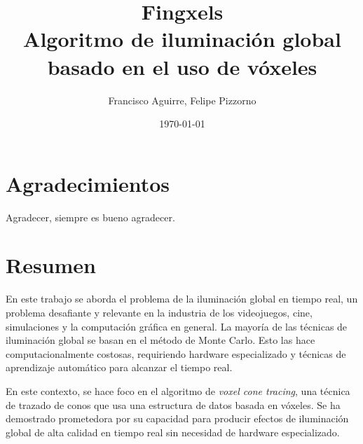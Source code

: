 \documentclass{prgrado}
\title{
	Fingxels \\
	\large Algoritmo de iluminación global basado en el uso de vóxeles
}
\author{Francisco Aguirre, Felipe Pizzorno}
\date{\today} %
\begin{document}

\frontmatter %

\maketitle


\chapter*{Agradecimientos}

Agradecer, siempre es bueno agradecer. %


\chapter*{Resumen}


En este trabajo se aborda el problema de la iluminación global en tiempo real, un problema desafiante y relevante en la industria de los videojuegos, cine, simulaciones y la computación gráfica en general.
La mayoría de las técnicas de iluminación global se basan en el método de Monte Carlo.
Esto las hace computacionalmente costosas, requiriendo hardware especializado y técnicas de aprendizaje automático para alcanzar el tiempo real.

En este contexto, se hace foco en el algoritmo de \textit{voxel cone tracing}, una técnica de trazado de conos que usa una estructura de datos basada en vóxeles.
Se ha demostrado prometedora por su capacidad para producir efectos de iluminación global de alta calidad en tiempo real sin necesidad de hardware especializado.
\end{document}
